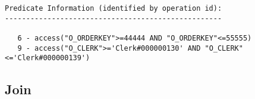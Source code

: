 \documentclass[11pt,a4paper,parskip=half]{scrartcl}
\begin{document}
\begin{lstlisting}
Predicate Information (identified by operation id):                                                                                                                                                                                                                                                          
---------------------------------------------------                                                                                                                                                                                                                                                          
                                                                                                                                                                                                                                                                                                             
   6 - access("O_ORDERKEY">=44444 AND "O_ORDERKEY"<=55555)                                                                                                                                                                                                                                                   
   9 - access("O_CLERK">='Clerk#000000130' AND "O_CLERK"<='Clerk#000000139')                                                                                                                                                                                                                                 
\end{lstlisting}


\subsection{Join}
\end{document}
